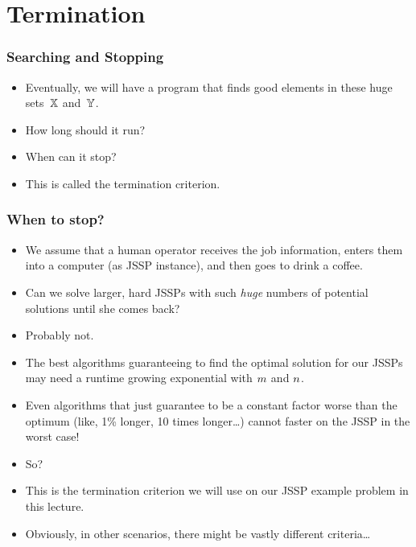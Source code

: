 \documentclass[mathserif]{beamer}%
\begin{document}
\section{Termination}%
%
\begin{frame}%
\frametitle{Searching and Stopping}%
\begin{itemize}%
\item Eventually, we will have a program that finds good elements in these huge sets~$\mathbb{X}$ and~$\mathbb{Y}$.%
\item<2-> How long should it run?%
\item<3-> When can it stop?%
\item<4-> This is called the \alert{termination criterion}.%
\end{itemize}%
\end{frame}%
%
\begin{frame}%
\frametitle{When to stop?}%
\begin{itemize}%
\item We assume that a human operator receives the job information, enters them into a computer (as JSSP instance), and then goes to drink a coffee.%
\item<2-> Can we solve larger, hard JSSPs with such \emph{huge} numbers of potential solutions until she comes back?%
\item<3-> Probably not.%
\item<4-> The best algorithms guaranteeing to find the optimal solution for our JSSPs may need a runtime growing exponential with $m$ and $n$.\cite{LLRKS1993SASAAC,CPW1998AROMSCAAA}
\item<5-> Even algorithms that just guarantee to be a constant factor worse than the optimum (like, 1\% longer, 10 times longer\dots) cannot faster on the JSSP in the worst case!\cite{WHHHLSS1997SSS,JMSO2005ASFJSSPWCPT,MS2011HOAFAJSSP}
\item<6-> So?%
\item<10-> This is the termination criterion we will use on our JSSP example problem in this lecture.%
\item<11-> Obviously, in other scenarios, there might be vastly different criteria\dots%
\end{itemize}%
\end{frame}%
%
\end{document}
